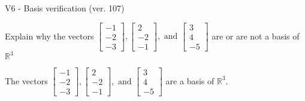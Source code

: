 \begin{exercise}
  \begin{exerciseTitle}V6 - Basis verification (ver. 107)\end{exerciseTitle}
  \begin{exerciseStatement}
    Explain why the vectors \(\left[\begin{array}{r}
-1 \\
-2 \\
-3
\end{array}\right] , \left[\begin{array}{r}
2 \\
-2 \\
-1
\end{array}\right] , \text{ and } \left[\begin{array}{r}
3 \\
4 \\
-5
\end{array}\right]\) are or are not a basis of \(\mathbb{R}^3\)	


  \end{exerciseStatement}
  \begin{exerciseAnswer}
   The vectors \(\left[\begin{array}{r}
-1 \\
-2 \\
-3
\end{array}\right] , \left[\begin{array}{r}
2 \\
-2 \\
-1
\end{array}\right] , \text{ and } \left[\begin{array}{r}
3 \\
4 \\
-5
\end{array}\right]\) 
  	 are  a basis of \(\mathbb{R}^3\).
  


  \end{exerciseAnswer}
\end{exercise}